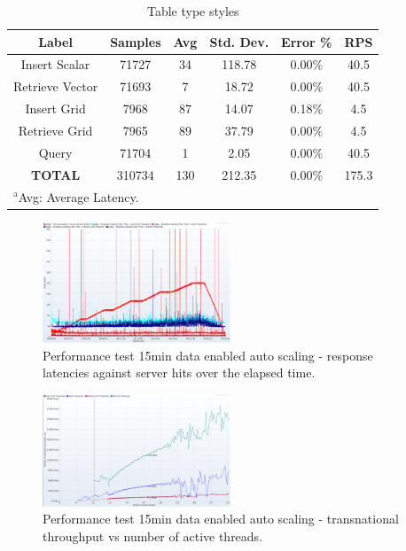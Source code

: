 \documentclass[conference]{IEEEtran}
\begin{document}
\begin{table}[htbp]
\caption{Table type styles}
\begin{center}
\begin{tabular}{|c|c|c|c|c|c|}
\hline
\textbf{Label} & \textbf{Samples} & \textbf{Avg} & \textbf{Std. Dev.} & \textbf{Error \%} & \textbf{RPS} \\ \hline
Insert Scalar & 71727 & 34 & 118.78 & 0.00\% & 40.5 \\ \hline
Retrieve Vector & 71693 & 7 & 18.72 & 0.00\% & 40.5 \\ \hline
Insert Grid & 7968 & 87 & 14.07 & 0.18\% & 4.5 \\ \hline
Retrieve Grid & 7965 & 89 & 37.79 & 0.00\% & 4.5 \\ \hline
Query & 71704 & 1 & 2.05 & 0.00\% & 40.5 \\ \hline
\textbf{TOTAL} & 310734 & 130 & 212.35 & 0.00\% & 175.3 \\ \hline
\multicolumn{4}{l}{$^{\mathrm{a}}$Avg: Average Latency.}
\end{tabular}
\label{tab:obs_all_auto_15_min_summary_throughput}
\end{center}
\end{table}

\begin{figure}[htbp]
\centerline{\includegraphics[width=0.5\textwidth]{results/obs/all_auto/obs_all_auto_15m_res_latencies_against_hits.png}}
\caption{Performance test 15min data enabled auto scaling - response latencies against server hits over the elapsed time.}
\label{fi:test_obs_auto_all_15_min_latency_vs_hits}
\end{figure}

\begin{figure}[htbp]
\centerline{\includegraphics[width=0.5\textwidth]{results/obs/all_auto/obs_all_auto_15m_transaction_throughtput_vs_threads.png}}
\caption{Performance test 15min data enabled auto scaling - transnational throughput vs number of active threads.}
\label{fi:test_obs_auto_all_15_min_throughput_vs_threads}
\end{figure}
\end{document}
